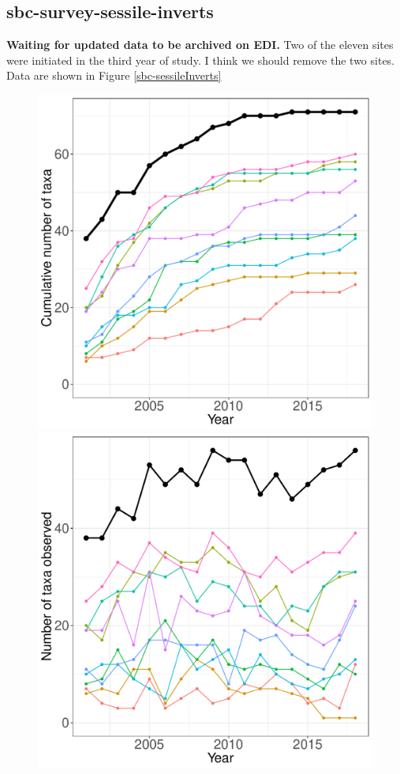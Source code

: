 \documentclass[11pt, oneside]{article}
\begin{document}
\subsection {sbc-survey-sessile-inverts}
{\bf Waiting for updated data to be archived on EDI.}
Two of the eleven sites were initiated in the third year of study.
I think we should remove the two sites.
Data are shown in Figure \ref{sbc-sessileInverts}
\begin{figure}[h!]
\centering
\includegraphics[scale = 0.4]{sbc-sessileInverts-castorani_species_accumulation_curve.pdf}
\includegraphics[scale = 0.4]{sbc-sessileInverts-castorani_num_taxa_over_time.pdf}

\end{figure}
\end{document}
